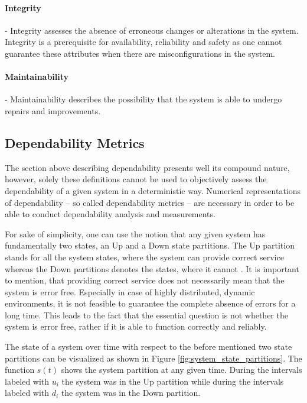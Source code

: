 \paragraph{Integrity} - Integrity assesses the absence of erroneous changes or alterations in the system. Integrity is a prerequisite for availability, reliability and safety as one cannot guarantee these attributes when there are misconfigurations in the system.

\paragraph{Maintainability} - Maintainability describes the possibility that the system is able to undergo repairs and improvements.


\subsection{Dependability Metrics}

The section above describing dependability presents well its compound nature, however, solely these definitions cannot be used to objectively assess the dependability of a given system in a deterministic way. Numerical representations of dependability -- so called dependability metrics -- are necessary in order to be able to conduct dependability analysis and measurements.

For sake of simplicity, one can use the notion that any given system has fundamentally two states, an Up and a Down state partitions. The Up partition stands for all the system states, where the system can provide correct service whereas the Down partitions denotes the states, where it cannot \cite{DependabilityBMEMIT}. It is important to mention, that providing correct service does not necessarily mean that the system is error free. Especially in case of highly distributed, dynamic environments, it is not feasible to guarantee the complete absence of errors for a long time. This leads to the fact that the essential question is not whether the system is error free, rather if it is able to function correctly and reliably.

The state of a system over time with respect to the before mentioned two state partitions can be visualized as shown in Figure \ref{fig:system_state_partitions}. The function \(s(t)\) shows the system partition at any given time. During the intervals labeled with \(u_i\) the system was in the Up partition while during the intervals labeled with \(d_i\) the system was in the Down partition.


